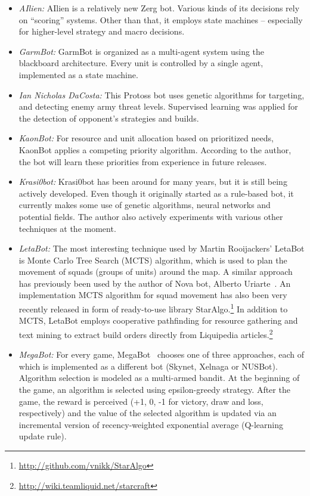 \begin{itemize}
  \item {\em AIlien:} AIlien is a relatively new Zerg bot. Various kinds of its decisions rely on ``scoring'' systems. Other than that, it employs state machines -- especially for higher-level strategy and macro decisions.
  
  \item {\em GarmBot:} GarmBot is organized as a multi-agent system using the blackboard architecture. Every unit is controlled by a single agent, implemented as a state machine.
  
  \item {\em Ian Nicholas DaCosta:} This Protoss bot uses genetic algorithms for targeting, and detecting enemy army threat levels. Supervised learning was applied for the detection of opponent's strategies and builds.
      
  \item {\em KaonBot:} For resource and unit allocation based on prioritized needs, KaonBot applies a competing priority algorithm. According to the author, the bot will learn these priorities from experience in future releases.
    
  \item {\em Krasi0bot:} Krasi0bot has been around for many years, but it is still being actively developed. Even though it originally started as a rule-based bot, it currently makes some use of genetic algorithms, neural networks and potential fields. The author also actively experiments with various other techniques at the moment.
  
  \item {\em LetaBot:} The most interesting technique used by Martin Rooijackers' LetaBot is Monte Carlo Tree Search (MCTS) algorithm, which is used to plan the movement of squads (groups of units) around the map. A similar approach has previously been used by the author of Nova bot, Alberto Uriarte~\cite{uriarte2014high}. An implementation MCTS algorithm for squad movement has also been very recently released in form of ready-to-use library StarAlgo.\footnote{\url{http://github.com/vnikk/StarAlgo}} In addition to MCTS, LetaBot employs cooperative pathfinding for resource gathering and text mining to extract build orders directly from Liquipedia articles.\footnote{\url{http://wiki.teamliquid.net/starcraft}}     

  \item {\em MegaBot:} For every game, MegaBot~\cite{tavares2016rock} chooses one of three approaches, each of which is implemented as a different bot (Skynet, Xelnaga or NUSBot). Algorithm selection is modeled as a multi-armed bandit. At the beginning of the game, an algorithm is selected using epsilon-greedy strategy. After the game, the reward is perceived (+1, 0, -1 for victory, draw and loss, respectively) and the value of the selected algorithm is updated via an incremental version of recency-weighted exponential average (Q-learning update rule).
  

\end{itemize}
